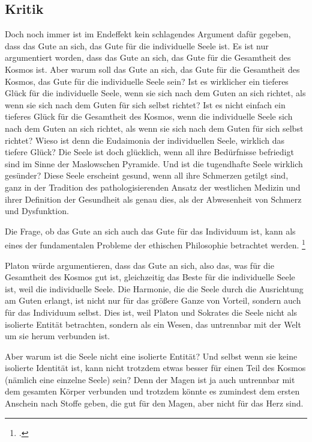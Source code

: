 \documentclass[12pt,a4paper]{article}
\begin{document}
\subsection[short]{Kritik}
Doch noch immer ist im Endeffekt kein schlagendes Argument dafür gegeben, dass das Gute an sich, das Gute für die individuelle Seele ist. Es ist nur argumentiert worden, dass das Gute an sich, das Gute für die Gesamtheit des Kosmos ist. Aber warum soll das Gute an sich, das Gute für die Gesamtheit des Kosmos, das Gute für die individuelle Seele sein? Ist es wirklicher ein tieferes Glück für die individuelle Seele, wenn sie sich nach dem Guten an sich richtet, als wenn sie sich nach dem Guten für sich selbst richtet? Ist es nicht einfach ein tieferes Glück für die Gesamtheit des Kosmos, wenn die individuelle Seele sich nach dem Guten an sich richtet, als wenn sie sich nach dem Guten für sich selbst richtet? Wieso ist denn die Eudaimonia der individuellen Seele, wirklich das tiefere Glück? Die Seele ist doch glücklich, wenn all ihre Bedürfnisse befriedigt sind im Sinne der Maslowschen Pyramide. Und ist die tugendhafte Seele wirklich gesünder? Diese Seele erscheint gesund, wenn all ihre Schmerzen getilgt sind, ganz in der Tradition des pathologisierenden Ansatz der westlichen Medizin und ihrer Definition der Gesundheit als genau dies, als der Abwesenheit von Schmerz und Dysfunktion.

Die Frage, ob das Gute an sich auch das Gute für das Individuum ist, kann als eines der fundamentalen Probleme der ethischen Philosophie betrachtet werden. \footcite{maslow1987}

Platon würde argumentieren, dass das Gute an sich, also das, was für die Gesamtheit des Kosmos gut ist, gleichzeitig das Beste für die individuelle Seele ist, weil die individuelle Seele. Die Harmonie, die die Seele durch die Ausrichtung am Guten erlangt, ist nicht nur für das größere Ganze von Vorteil, sondern auch für das Individuum selbst. Dies ist, weil Platon und Sokrates die Seele nicht als isolierte Entität betrachten, sondern als ein Wesen, das untrennbar mit der Welt um sie herum verbunden ist. 

Aber warum ist die Seele nicht eine isolierte Entität? Und selbst wenn sie keine isolierte Identität ist, kann nicht trotzdem etwas besser für einen Teil des Kosmos (nämlich eine einzelne Seele) sein? Denn der Magen ist ja auch untrennbar mit dem gesamten Körper verbunden und trotzdem könnte es zumindest dem ersten Anschein nach Stoffe geben, die gut für den Magen, aber nicht für das Herz sind.
\end{document}
